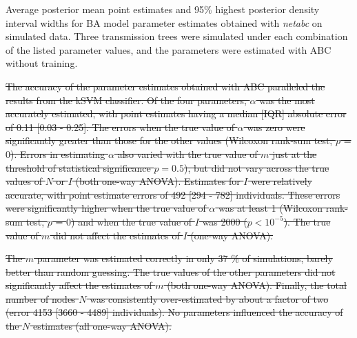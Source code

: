 \documentclass[12pt]{article}\usepackage[]{graphicx}\usepackage[]{color}
\newcommand{\del}[1]{\color{red} \sout{#1} \color{black}}
\newcommand{\tablepath}{../tables}
\begin{document}
\begin{table}[ht]
    \centering
    
    \caption[
        Average posterior mean point estimates and 95\% highest posterior
        density interval widths for BA model parameter estimates obtained
        with \textit{netabc} on simulated data.
    ]{
        Average posterior mean point estimates and 95\% highest posterior
        density interval widths for BA model parameter estimates obtained with
        \textit{netabc} on simulated data. Three transmission trees were
        simulated under each combination of the listed parameter values, and
        the parameters were estimated with ABC without training.
    }
    \label{tab:abchpd}
\end{table}

\del{The accuracy of the parameter estimates obtained with ABC
paralleled the results from the kSVM classifier. Of the four parameters,
$\alpha$ was the most accurately estimated, with point estimates having a
median [IQR] absolute error of 
    0.11 
    [0.03 - 
    0.25].
The errors when the true value of $\alpha$ was zero were significantly greater
than those for the other values 
(Wilcoxon rank-sum test, $p$ = $0$).
Errors in estimating $\alpha$ also varied with the true value of $m$ just at
the threshold of statistical significance
    $p =0.5$),
but did not vary across the true values of $N$ or $I$ (both one-way ANOVA).
Estimates for $I$ were relatively accurate, with point estimate errors of
    492 
    [294 - 
    782] individuals.
These errors were significantly higher when the true value of $\alpha$ was
at least 1
    (Wilcoxon rank-sum test, $p$ = $0$)
and when the true value of $I$ was 2000 ($p < 10^{-5}$). The true value of $m$
did not affect the estimates of $I$ (one-way ANOVA).}

\del{The $m$ parameter was estimated correctly in only
    37 \%
of simulations, barely better than random guessing. The true values of the
other parameters did not significantly affect the estimates of $m$ (both
one-way ANOVA). Finally, the total number of nodes $N$ was consistently
over-estimated by about a factor of two
    (error 4153 
    [3660 - 
     4489] individuals).
No parameters influenced the accuracy of the $N$ estimates (all one-way ANOVA).}
\end{document}

